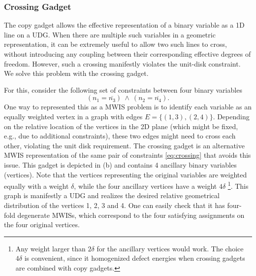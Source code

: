 \subsubsection{Crossing Gadget}

The copy gadget allows the effective representation of a binary variable as a 1D line on a UDG. When there are multiple such variables in a geometric representation, it can be extremely useful to allow two such lines to cross, without introducing any coupling between their corresponding effective degrees of freedom. However, such a crossing manifestly violates the unit-disk constraint. We solve this problem with the crossing gadget.

For this, consider the following set of constraints between four binary variables
\begin{equation}\label{eq:crossing}
    (n_1 = \overline{n_3}) \ \wedge \ (n_2 = \overline{n_4}).
\end{equation}
One way to represented this as a MWIS problem is to  identify each variable as an equally weighted vertex in a graph with edges $E = \{ (1, 3), (2, 4) \}$. Depending on the relative location of the  vertices in the 2D plane (which might be  fixed, e.g., due to additional constraints), these two edges might need to cross each other, violating the unit disk requirement. The crossing gadget is an alternative MWIS representation of the same pair of constraints \eqref{eq:crossing} that avoids this issue. This gadget is depicted in (b) and contains 4 ancillary binary variables (vertices). Note that the vertices representing the original variables are weighted equally with a weight $\delta$, while the four ancillary vertices have a weight $4\delta$ \footnote{Any weight larger than $2\delta$ for the ancillary vertices would work. The choice $4\delta$ is convenient, since it homogenized defect energies when crossing gadgets are combined with copy gadgets.}.
This graph is manifestly a UDG and realizes the desired relative geometrical distribution of the vertices 1, 2, 3 and 4. One can easily check that it has four-fold degenerate MWISs, which correspond to the four satisfying assignments on the four original vertices. 

